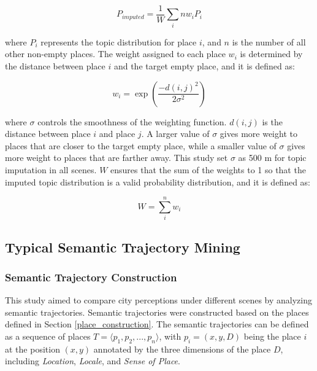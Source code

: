 \documentclass{article}
\theoremstyle{remark}
\begin{document}
\begin{equation} \label{eq:topic_imputation}
    P_{imputed} = \frac{1}{W}\sum_{i}{n}w_{i}P_{i}
\end{equation}

where $P_{i}$ represents the topic distribution for place $i$, and $n$ is the number of all other non-empty places. The weight assigned to each place $w_{i}$ is determined by the distance between place $i$ and the target empty place, and it is defined as:

\begin{equation} \label{eq:topic_imputation_w_i}
    w_{i} = \exp(\frac{-d(i,j)^2}{2\sigma^2})
\end{equation}

where $\sigma$ controls the smoothness of the weighting function. $d(i,j)$ is the distance between place $i$ and place $j$. A larger value of $\sigma$ gives more weight to places that are closer to the target empty place, while a smaller value of $\sigma$ gives more weight to places that are farther away. This study set $\sigma$ as 500 m for topic imputation in all scenes. $W$ ensures that the sum of the weights to 1 so that the imputed topic distribution is a valid probability distribution, and it is defined as:

\begin{equation} \label{eq:topic_imputation_W}
    W = \sum_{i}^{n}w_{i}
\end{equation}

\subsection{Typical Semantic Trajectory Mining} \label{typical_semantic_trajectory_mining}

\subsubsection{Semantic Trajectory Construction}
This study aimed to compare city perceptions under different scenes by analyzing semantic trajectories. Semantic trajectories were constructed based on the places defined in Section \ref{place_construction}. The semantic trajectories can be defined as a sequence of places $T = \langle p_{1}, p_{2}, ..., p_{n} \rangle$, with $p_{i} = (x,y,D)$ being the place $i$ at the position $(x,y)$ annotated by the three dimensions of the place $D$, including \textit{Location}, \textit{Locale}, and \textit{Sense of Place}.
\end{document}
